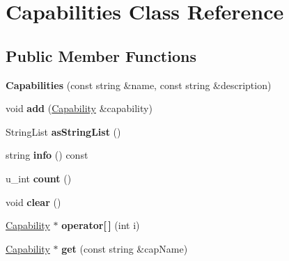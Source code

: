 \hypertarget{classrrp_1_1_capabilities}{\section{Capabilities Class Reference}
\label{classrrp_1_1_capabilities}
}
\subsection*{Public Member Functions}
\begin{DoxyCompactItemize}
\item 
\hypertarget{classrrp_1_1_capabilities_ac6c00fd931b602e7666c03a8fc34d012}{{\bfseries Capabilities} (const string \&name, const string \&description)}\label{classrrp_1_1_capabilities_ac6c00fd931b602e7666c03a8fc34d012}

\item 
\hypertarget{classrrp_1_1_capabilities_a02889dbf47c1d7d5ac5cd93c1126ee1d}{void {\bfseries add} (\hyperlink{classrrp_1_1_capability}{Capability} \&capability)}\label{classrrp_1_1_capabilities_a02889dbf47c1d7d5ac5cd93c1126ee1d}

\item 
\hypertarget{classrrp_1_1_capabilities_a4c448b0ecae4b91f04e64343de3667d0}{String\-List {\bfseries as\-String\-List} ()}\label{classrrp_1_1_capabilities_a4c448b0ecae4b91f04e64343de3667d0}

\item 
\hypertarget{classrrp_1_1_capabilities_acc80902dc44288c81cae1c249eaeb0ae}{string {\bfseries info} () const }\label{classrrp_1_1_capabilities_acc80902dc44288c81cae1c249eaeb0ae}

\item 
\hypertarget{classrrp_1_1_capabilities_ac48d94d462ad09de78524ecc4e2739b0}{u\-\_\-int {\bfseries count} ()}\label{classrrp_1_1_capabilities_ac48d94d462ad09de78524ecc4e2739b0}

\item 
\hypertarget{classrrp_1_1_capabilities_ac8bb3912a3ce86b15842e79d0b421204}{void {\bfseries clear} ()}\label{classrrp_1_1_capabilities_ac8bb3912a3ce86b15842e79d0b421204}

\item 
\hypertarget{classrrp_1_1_capabilities_a127b3b265d5937ae689af3ab85ad51e6}{\hyperlink{classrrp_1_1_capability}{Capability} $\ast$ {\bfseries operator\mbox{[}$\,$\mbox{]}} (int i)}\label{classrrp_1_1_capabilities_a127b3b265d5937ae689af3ab85ad51e6}

\item 
\hypertarget{classrrp_1_1_capabilities_a02418f1ce1a046666527d453f1efc7a9}{\hyperlink{classrrp_1_1_capability}{Capability} $\ast$ {\bfseries get} (const string \&cap\-Name)}\label{classrrp_1_1_capabilities_a02418f1ce1a046666527d453f1efc7a9}


\end{DoxyCompactItemize}
